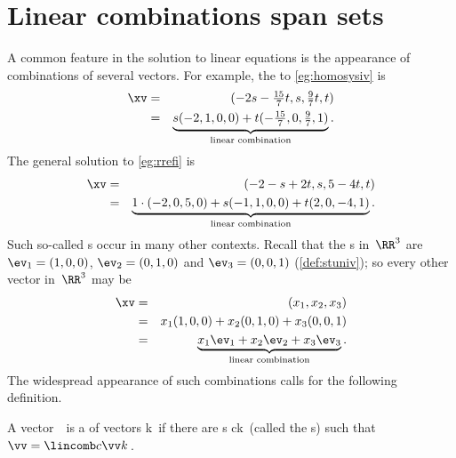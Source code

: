
\section{Linear combinations span sets}
\label{sec:lcss}
{}

\begin{comment}
\pooliv{\S2.3} \layiv{\S1.3} \holti{\S2.1--2} \nakos{\S2.3}
\end{comment}



A common feature in the solution to linear equations is the  appearance of combinations of several vectors.
For example, the  to \cref{eg:homosysiv}  is 
\begin{eqnarray*}
\xv&=&(-2s-\tfrac{15}7t,s,\tfrac97t,t) 
\\&=&\underbrace{s(-2,1,0,0)+t(-\tfrac{15}7,0,\tfrac97,1)}_{\text{linear combination}}.
\end{eqnarray*}
The general solution to \cref{eg:rrefi} is
\begin{eqnarray*}
\xv&=&(-2-s+2t,s,5-4t,t)
\\&=&\underbrace{1\cdot(-2,0,5,0)+s(-1,1,0,0)+t(2,0,-4,1)}_{\text{linear combination}}.
\end{eqnarray*}
Such so-called s occur in many other contexts.
Recall that the s in~\(\RR^3\) are \(\ev_1=(1,0,0)\), \(\ev_2=(0,1,0)\) and \(\ev_3=(0,0,1)\) (\cref{def:stuniv}); so every other vector in~\(\RR^3\) may be 
\begin{eqnarray*}
\xv&=&(x_1,x_2,x_3)
\\&=&x_1(1,0,0)+x_2(0,1,0)+x_3(0,0,1)
\\&=&\underbrace{x_1\ev_1+x_2\ev_2+x_3\ev_3}_{\text{linear combination}}.
\end{eqnarray*}
The widespread appearance of such combinations calls for the following definition.

\begin{definition} \label{def:lincom}
A vector~\vv\ is a  of vectors \hlist\vv k\ if there are s \hlist ck\ (called the s) such that \(\vv=\lincomb c\vv k\)\,.
\end{definition}



